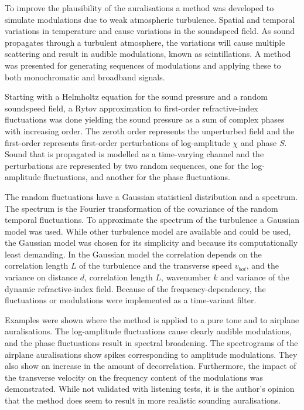 To improve the plausibility of the auralisations
a method was developed to simulate modulations due to weak atmospheric
turbulence. Spatial and temporal variations in temperature and cause variations
in the soundspeed field. As sound propagates through a turbulent atmosphere, the
variations will cause multiple scattering and result in audible modulations,
known as scintillations. A method was presented for generating sequences of
modulations and applying these to both monochromatic and broadband signals.

Starting with a Helmholtz equation for the sound pressure and a random
soundspeed field, a Rytov approximation to first-order refractive-index
fluctuations was done yielding the sound pressure as a sum of complex phases
with increasing order. The zeroth order represents the unperturbed field and the
first-order represents first-order perturbations of log-amplitude $\chi$ and
phase $S$. Sound that is propagated is modelled as a time-varying channel and
the perturbations are represented by two random sequences, one for the
log-amplitude fluctuations, and another for the phase fluctuations.

The random fluctuations have a Gaussian statistical distribution and a spectrum.
The spectrum is the Fourier transformation of the covariance of the random
temporal fluctuations. To approximate the spectrum of the turbulence a Gaussian
model was used. While other turbulence model are available and could be used,
the Gaussian model was chosen for its simplicity and because its computationally
least demanding. In the Gaussian model the correlation depends on the
correlation length $L$ of the turbulence and the transverse speed $v_{bot}$, and
the variance on distance $d$, correlation length $L$, wavenumber $k$ and
variance of the dynamic refractive-index field. Because of the
frequency-dependency, the fluctuations or modulations were implemented as a
time-variant filter.

Examples were shown where the method is applied to a pure tone and to airplane
auralisations. The log-amplitude fluctuations cause clearly audible modulations,
and the phase fluctuations result in spectral broadening. The spectrograms of
the airplane auralisations show spikes corresponding to amplitude modulations.
They also show an increase in the amount of decorrelation. Furthermore, the
impact of the transverse velocity on the frequency content of the modulations
was demonstrated. While not validated with listening tests, it is the author's
opinion that the method does seem to result in more realistic sounding
auralisations.


